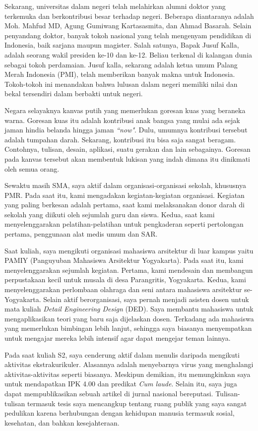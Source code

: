 \documentclass[../main.tex]{subfiles}
\begin{document}
Sekarang, universitas dalam negeri telah melahirkan alumni doktor yang terkemuka dan berkontribusi besar terhadap negeri. Beberapa diantaranya adalah Moh. Mahfud MD, Agung Gumiwang Kartasasmita, dan Ahmad Basarah. Selain penyandang doktor, banyak tokoh nasional yang telah mengenyam pendidikan di Indonesia, baik sarjana maupun magister. Salah satunya, Bapak Jusuf Kalla, adalah seorang wakil presiden ke-10 dan ke-12. Beliau terkenal di kalangan dunia sebagai tokoh perdamaian. Jusuf kalla, sekarang adalah ketua umum Palang Merah Indonesia (PMI), telah memberikan banyak makna untuk Indonesia. Tokoh-tokoh ini menandakan bahwa lulusan dalam negeri memiliki nilai dan bekal tersendiri dalam berbakti untuk negeri.

Negara selayaknya kanvas putih yang memerlukan goresan kuas yang beraneka warna. Goresan kuas itu adalah kontribusi anak bangsa yang mulai ada sejak jaman hindia belanda hingga jaman \textit{``now"}. Dulu, umumnya kontribusi tersebut adalah tumpahan darah. Sekarang, kontribusi itu bisa saja sangat beragam. Contohnya, tulisan, desain, aplikasi, suatu gerakan dan lain sebagainya. Goresan pada kanvas tersebut akan membentuk lukisan yang indah dimana itu dinikmati oleh semua orang.

Sewaktu masih SMA, saya aktif dalam organisasi-organisasi sekolah, khususnya PMR. Pada saat itu, kami mengadakan kegiatan-kegiatan organisasi. Kegiatan yang paling berkesan adalah pertama, saat kami melaksanakan donor darah di sekolah yang diikuti oleh sejumlah guru dan siswa. Kedua, saat kami menyelenggarakan pelatihan-pelatihan untuk pengkaderan seperti pertolongan pertama, penggunaan alat medis umum dan SAR.

Saat kuliah, saya mengikuti organisasi mahasiswa arsitektur di luar kampus yaitu PAMIY (Panguyuban Mahasiswa Arsitektur Yogyakarta). Pada saat itu, kami menyelenggarakan sejumlah kegiatan. Pertama, kami mendesain dan membangun perpustakaan kecil untuk musala di desa Parangritis, Yogyakarta. Kedua, kami menyelenggarakan perlombaan olahraga dan seni antara mahasiswa arsitektur se-Yogyakarta. Selain aktif berorganisasi, saya pernah menjadi asisten dosen untuk mata kuliah \textit{Detail Engineering Design} (DED). Saya membantu mahasiswa untuk mengaplikasikan teori yang baru saja dijelaskan dosen. Terkadang ada mahasiswa yang memerlukan bimbingan lebih lanjut, sehingga saya biasanya menyempatkan untuk mengajar mereka lebih intensif agar dapat mengejar teman lainnya.

Pada saat kuliah S2, saya cenderung aktif dalam menulis daripada mengikuti aktivitas ekstrakurikuler. Alasannya adalah menyebarnya virus yang menghalangi aktivitas-aktivitas seperti biasanya. Meskipun demikian, itu memungkinkan saya untuk mendapatkan IPK 4.00 dan predikat \textit{Cum laude}. Selain itu, saya juga dapat mempublikasikan sebuah artikel di jurnal nasional bereputasi. Tulisan-tulisan termasuk tesis saya mencangkup tentang ruang publik yang saya sangat pedulikan karena berhubungan dengan kehidupan manusia termasuk sosial, kesehatan, dan bahkan kesejahteraan.
\end{document}

